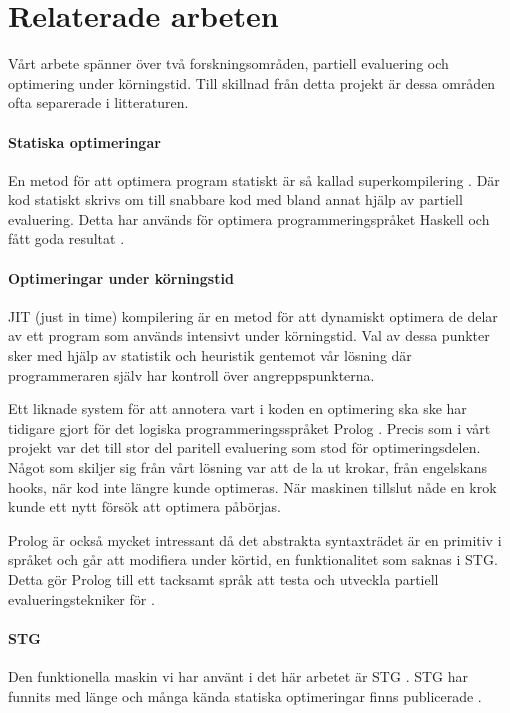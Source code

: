 \documentclass[Rapport]{subfiles}
\begin{document}
\section{Relaterade arbeten}

Vårt arbete spänner över två forskningsområden, partiell evaluering
och optimering under körningstid. Till skillnad från detta projekt 
är dessa områden ofta separerade i litteraturen.

\paragraph{Statiska optimeringar} 
En metod för att optimera program statiskt är så kallad superkompilering \cite{srensen1995algorithm}. Där kod statiskt skrivs om till snabbare kod med bland annat hjälp av partiell evaluering. Detta har används för optimera programmeringspråket Haskell och fått goda resultat \cite{mitchell2007supercompiler}.


\paragraph{Optimeringar under körningstid}
JIT (just in time) kompilering är en metod för att dynamiskt optimera
de delar av ett program som används intensivt under körningstid. Val av
dessa punkter sker med hjälp av statistik och heuristik gentemot vår
lösning där programmeraren själv har kontroll över angreppspunkterna. 

Ett liknade system för att annotera vart i koden en optimering ska ske har tidigare gjort för det logiska programmeringsspråket Prolog \cite{bolz-automatic}.
Precis som i vårt projekt var det till stor del paritell evaluering som stod för optimeringsdelen. Något som skiljer sig från vårt lösning var att de la ut krokar, från engelskans hooks, när kod inte längre kunde optimeras. När maskinen tillslut nåde en krok kunde ett nytt försök att optimera påbörjas. 

Prolog är också mycket intressant då det abstrakta syntaxträdet är en primitiv i språket och går att modifiera under körtid, en funktionalitet som saknas i STG.
Detta gör Prolog till ett tacksamt språk att testa och utveckla partiell evalueringstekniker för \cite{ecce}.



\paragraph{STG}
Den funktionella maskin vi har använt i det här arbetet är 
STG \cite{stg}. STG har funnits med länge och många kända statiska optimeringar finns publicerade \cite{santos}.
\end{document}
